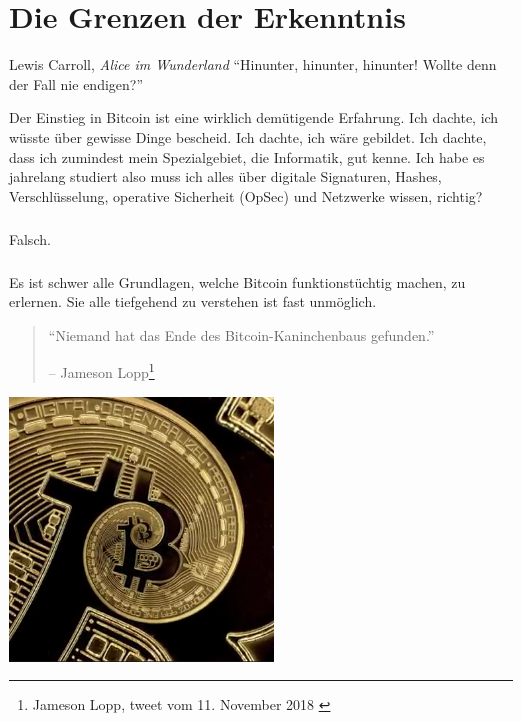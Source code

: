 \chapter{Die Grenzen der Erkenntnis}
\label{les:7}

\begin{chapquote}{Lewis Carroll, \textit{Alice im Wunderland}}
\enquote{Hinunter, hinunter, hinunter! Wollte denn der Fall nie endigen?}
\end{chapquote}

Der Einstieg in Bitcoin ist eine wirklich demütigende Erfahrung. Ich dachte, ich
wüsste über gewisse Dinge bescheid. Ich dachte, ich wäre gebildet. Ich dachte,
dass ich zumindest mein Spezialgebiet, die Informatik, gut kenne. Ich habe es
jahrelang studiert also muss ich alles über digitale Signaturen, Hashes,
Verschlüsselung, operative Sicherheit (OpSec) und Netzwerke wissen, richtig?

\paragraph{}
Falsch.

\paragraph{}
Es ist schwer alle Grundlagen, welche Bitcoin funktionstüchtig machen, zu
erlernen. Sie alle tiefgehend zu verstehen ist fast unmöglich.

\begin{quotation}\begin{samepage}
\enquote{Niemand hat das Ende des Bitcoin-Kaninchenbaus gefunden.}
\begin{flushright} -- Jameson Lopp\footnote{Jameson Lopp, tweet vom 11. November 2018 \cite{lopp-tweet}}
\end{flushright}\end{samepage}\end{quotation}

\begin{center}
  \centering
  \includegraphics[width=7cm]{assets/images/rabbit-hole-bottomless.png}
  \label{fig:rabbit-hole-bottomless}
\end{center}

